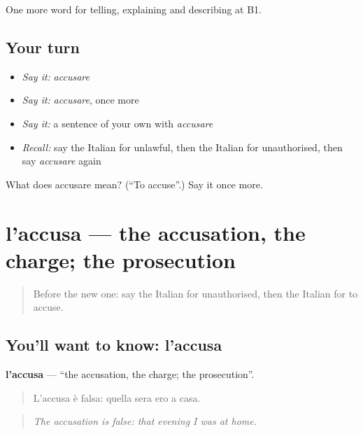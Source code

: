 \begin{grammarlens}[title={What you've built}]
One more word for telling, explaining and describing at B1.
\end{grammarlens}

\subsection*{Your turn}
\begin{itemize}
\raggedright
  \item \emph{Say it:} \emph{accusare}
  \item \emph{Say it:} \emph{accusare}, once more
  \item \emph{Say it:} a sentence of your own with \emph{accusare}
  \item \emph{Recall:} say the Italian for unlawful, then the Italian for unauthorised, then say \emph{accusare} again
\end{itemize}

\begin{tcolorbox}[breakable,colback=teal!4,colframe=teal!35!black,title={Before you move on}]
What does accusare mean? (\textquotedblleft{}To accuse\textquotedblright{}.) Say it once more.
\end{tcolorbox}
\section[l'accusa]{l'accusa — the accusation, the charge; the prosecution}

\label{lesson:IT-C391-accusa}



\begin{quote}
Before the new one: say the Italian for unauthorised, then the Italian for to accuse.
\end{quote}

\subsection*{You'll want to know: l'accusa}
\textbf{l'accusa} — \textquotedblleft{}the accusation, the charge; the prosecution\textquotedblright{}.

\begin{quote}
L'accusa è falsa: quella sera ero a casa.
\end{quote}

\begin{quote}
\emph{The accusation is false: that evening I was at home.}
\end{quote}

